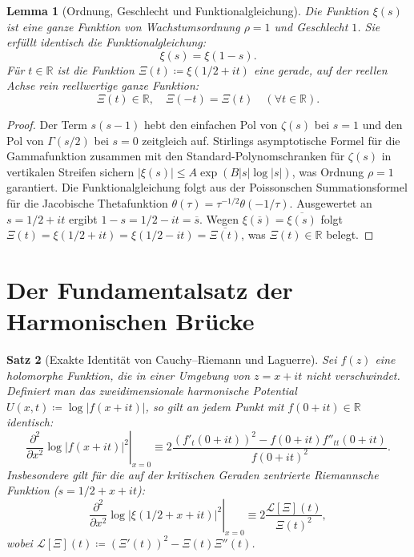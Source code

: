 \documentclass[11pt,a4paper]{article}
\newtheorem{theorem}{Satz}[section]
\newtheorem{lemma}[theorem]{Lemma}
\theoremstyle{definition}
\theoremstyle{remark}
\begin{document}
\begin{lemma}[Ordnung, Geschlecht und Funktionalgleichung]
Die Funktion $\xi(s)$ ist eine ganze Funktion von Wachstumsordnung $\rho = 1$ und Geschlecht $1$. Sie erfüllt identisch die Funktionalgleichung:
\begin{equation}
\xi(s) = \xi(1 - s).
\end{equation}
Für $t \in \mathbb{R}$ ist die Funktion $\Xi(t) \coloneqq \xi(1/2 + it)$ eine gerade, auf der reellen Achse rein reellwertige ganze Funktion:
\begin{equation}
\Xi(t) \in \mathbb{R}, \quad \Xi(-t) = \Xi(t) \quad (\forall t \in \mathbb{R}).
\end{equation}
\end{lemma}

\begin{proof}
Der Term $s(s-1)$ hebt den einfachen Pol von $\zeta(s)$ bei $s=1$ und den Pol von $\Gamma(s/2)$ bei $s=0$ zeitgleich auf. Stirlings asymptotische Formel für die Gammafunktion zusammen mit den Standard-Polynomschranken für $\zeta(s)$ in vertikalen Streifen sichern $|\xi(s)| \le A \exp(B |s| \log |s|)$, was Ordnung $\rho = 1$ garantiert. Die Funktionalgleichung folgt aus der Poissonschen Summationsformel für die Jacobische Thetafunktion $\theta(\tau) = \tau^{-1/2}\theta(-1/\tau)$. Ausgewertet an $s = 1/2 + it$ ergibt $1 - s = 1/2 - it = \overline{s}$. Wegen $\xi(\overline{s}) = \overline{\xi(s)}$ folgt $\Xi(t) = \xi(1/2 + it) = \xi(1/2 - it) = \overline{\Xi(t)}$, was $\Xi(t) \in \mathbb{R}$ belegt.
\end{proof}

\section{Der Fundamentalsatz der Harmonischen Brücke}

\begin{theorem}[Exakte Identität von Cauchy--Riemann und Laguerre]
\label{thm:puente_armonico_experto}
Sei $f(z)$ eine holomorphe Funktion, die in einer Umgebung von $z = x + it$ nicht verschwindet. Definiert man das zweidimensionale harmonische Potential $U(x, t) \coloneqq \log |f(x + it)|$, so gilt an jedem Punkt mit $f(0 + it) \in \mathbb{R}$ identisch:
\begin{equation}
\left.\frac{\partial^2}{\partial x^2}\log |f(x + it)|^2\right|_{x=0} \equiv 2 \frac{(f'_t(0+it))^2 - f(0+it) f''_{tt}(0+it)}{f(0+it)^2}.
\end{equation}
Insbesondere gilt für die auf der kritischen Geraden zentrierte Riemannsche Funktion ($s = 1/2 + x + it$):
\begin{equation}
\left.\frac{\partial^2}{\partial x^2}\log |\xi(1/2 + x + it)|^2\right|_{x=0} \equiv 2 \frac{\mathcal{L}[\Xi](t)}{\Xi(t)^2},
\end{equation}
wobei $\mathcal{L}[\Xi](t) \coloneqq (\Xi'(t))^2 - \Xi(t)\Xi''(t)$.
\end{theorem}
\end{document}
